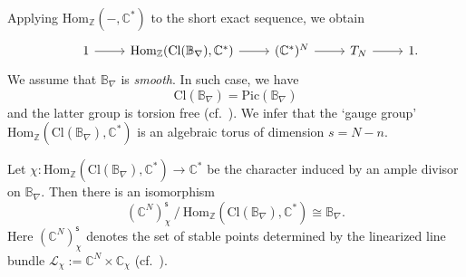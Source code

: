 \documentclass[12pt,a4paper,oneside]{amsart}
\numberwithin{equation}{section}
\theoremstyle{definition}
\theoremstyle{remark}
\begin{document}
Applying \(\mathrm{Hom}_{\mathbb{Z}}(-,\mathbb{C}^{\ast})\) to the short exact sequence, we obtain
\begin{equation*}
\begin{tikzcd}
    &1\ar[r] &\mathrm{Hom}_{\mathbb{Z}}(\mathrm{Cl}(\mathbb{B}_{\nabla}),\mathbb{C}^{\ast})
    \ar[r] &(\mathbb{C}^{\ast})^{N}\ar[r] 
    &T_{N}\ar[r]&1.
\end{tikzcd}
\end{equation*}
We assume that \(\mathbb{B}_{\nabla}\)
is \emph{smooth}. In such case, we have
\begin{equation*}
    \mathrm{Cl}(\mathbb{B}_{\nabla})=\mathrm{Pic}(\mathbb{B}_{\nabla})
\end{equation*}
and the latter group is torsion free (cf.~\cite[Proposition 4.2.5]{Cox:2011tor}).
We infer that the `gauge group' 
\(\mathrm{Hom}_{\mathbb{Z}}(\mathrm{Cl}(\mathbb{B}_{\nabla}),\mathbb{C}^{\ast})\) is an algebraic torus 
of dimension \(s=N-n\).

Let \(\chi\colon \mathrm{Hom}_{\mathbb{Z}}(\mathrm{Cl}(\mathbb{B}_{\nabla}),
\mathbb{C}^{\ast})\to \mathbb{C}^{\ast}\) be the character 
induced by an ample divisor on \(\mathbb{B}_{\nabla}\). Then there is an isomorphism
\begin{equation*}
    (\mathbb{C}^{N})^{\mathsf{s}}_{\chi}~\slash~\mathrm{Hom}_{\mathbb{Z}}(\mathrm{Cl}(\mathbb{B}_{\nabla}),\mathbb{C}^{\ast})
    \cong \mathbb{B}_{\nabla}.
\end{equation*}
Here \((\mathbb{C}^{N})^{\mathsf{s}}_{\chi}\) denotes
the set of stable points determined by
the linearized line bundle \(\mathscr{L}_{\chi}:=\mathbb{C}^{N}\times \mathbb{C}_{\chi}\)
(cf.~\cite[Chapter 14]{Cox:2011tor}).
\end{document}
